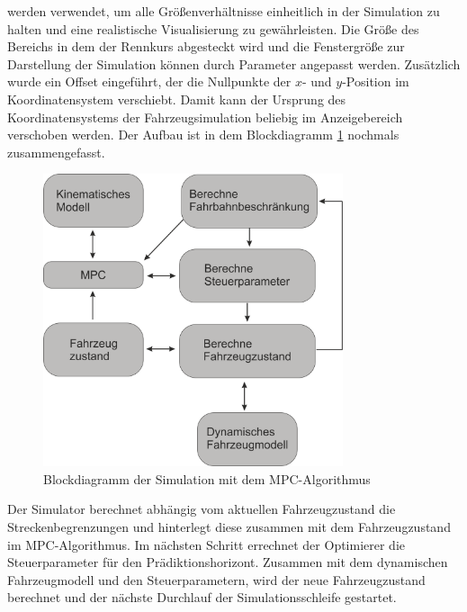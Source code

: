 \documentclass{like}
\begin{document}
werden verwendet, um alle Größenverhältnisse einheitlich in der Simulation zu halten und eine realistische Visualisierung zu gewährleisten. 
Die Größe des Bereichs in dem der Rennkurs abgesteckt wird und die Fenstergröße zur Darstellung der Simulation können durch Parameter angepasst werden. Zusätzlich wurde ein Offset eingeführt, der die Nullpunkte der \(x\)- und \(y\)-Position im Koordinatensystem verschiebt. Damit kann der Ursprung des Koordinatensystems der Fahrzeugsimulation beliebig im Anzeigebereich verschoben werden. 
Der Aufbau ist in dem Blockdiagramm \ref{fig:block_diagram_sim} nochmals zusammengefasst. 
\begin{figure}[ht!]
	\centering
	\includegraphics[width=250pt]{Abbildungen/MPCSimulation.png}
	\caption{Blockdiagramm der Simulation mit dem \ac{MPC}-Algorithmus}
	\label{fig:block_diagram_sim}
\end{figure}
Der Simulator berechnet abhängig vom aktuellen Fahrzeugzustand die Streckenbegrenzungen und hinterlegt diese zusammen mit dem Fahrzeugzustand im \ac{MPC}-Algorithmus. Im nächsten Schritt errechnet der Optimierer die Steuerparameter für den Prädiktionshorizont. Zusammen mit dem dynamischen Fahrzeugmodell und den Steuerparametern, wird der neue Fahrzeugzustand berechnet und der nächste Durchlauf der Simulationsschleife gestartet.
\end{document}
